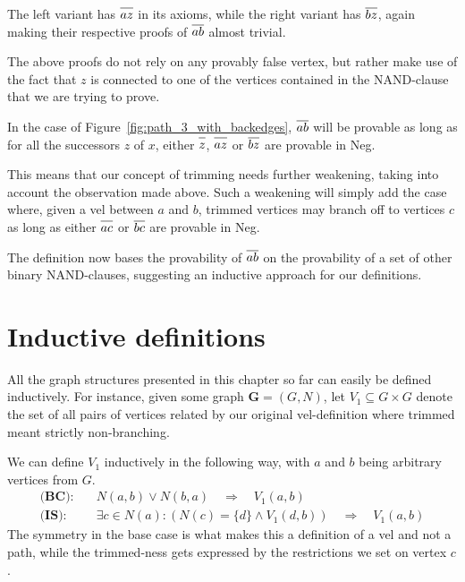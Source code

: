 The left variant has $\ol{az}$ in its axioms, while the right variant has $\ol{bz}$, again making their respective proofs of $\ol{ab}$ almost trivial.\par
\begin{figure}[!h]
  \centering
  \begin{prooftree}
  \end{prooftree}
  \hspace{5mm}
  \begin{prooftree}
  \end{prooftree}
  \caption{}
  \label{fig:proof_loop}
\end{figure}
\FloatBarrier
The above proofs do not rely on any provably false vertex, but rather make use of the fact that $z$ is connected to one of the vertices contained in the NAND-clause that we are trying to prove.

In the case of Figure~\ref{fig:path_3_with_backedges}, $\ol{ab}$ will be provable as long as for all the successors $z$ of $x$, either $\ol{z}$, $\ol{az}$ or $\ol{bz}$ are provable in Neg.

This means that our concept of trimming needs further weakening, taking into account the observation made above.
Such a weakening will simply add the case where, given a vel between $a$ and $b$, trimmed vertices may branch off to vertices $c$ as long as either $\ol{ac}$ or $\ol{bc}$ are provable in Neg.

The definition now bases the provability of $\ol{ab}$ on the provability of a set of other binary NAND-clauses, suggesting an inductive approach for our definitions.

\section{Inductive definitions}
\label{sec:Inductive definitions}
All the graph structures presented in this chapter so far can easily be defined inductively.
For instance, given some graph $\mathbf{G}=(G,N)$, let $V_1 \subseteq G \times G$ denote the set of all pairs of vertices related by our original vel-definition where trimmed meant strictly non-branching.

We can define $V_1$ inductively in the following way, with $a$ and $b$ being arbitrary vertices from $G$.
\begin{align}
  \textbf{(BC):}&\quad N(a,b) \vee N(b,a) \quad \Rightarrow \quad  V_1(a,b)\\
  \textbf{(IS):}&\quad \exists c \in N(a): (N(c) =\{d\} \wedge V_1(d,b)) \quad \Rightarrow \quad V_1(a,b)
\end{align}
The symmetry in the base case is what makes this a definition of a vel and not a path, while the trimmed-ness gets expressed by the restrictions we set on vertex $c$.


